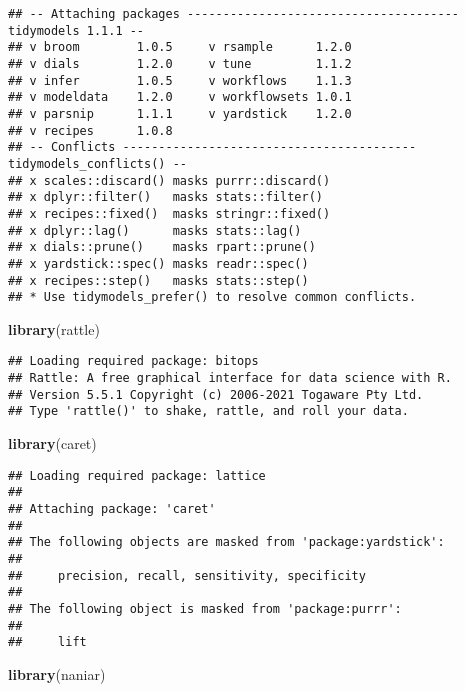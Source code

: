 \documentclass[
]{article}
\newenvironment{Shaded}{\begin{snugshade}}{\end{snugshade}}
\newcommand{\FunctionTok}[1]{\textcolor[rgb]{0.13,0.29,0.53}{\textbf{#1}}}
\newcommand{\NormalTok}[1]{#1}
\begin{document}
\begin{verbatim}
## -- Attaching packages -------------------------------------- tidymodels 1.1.1 --
## v broom        1.0.5     v rsample      1.2.0
## v dials        1.2.0     v tune         1.1.2
## v infer        1.0.5     v workflows    1.1.3
## v modeldata    1.2.0     v workflowsets 1.0.1
## v parsnip      1.1.1     v yardstick    1.2.0
## v recipes      1.0.8     
## -- Conflicts ----------------------------------------- tidymodels_conflicts() --
## x scales::discard() masks purrr::discard()
## x dplyr::filter()   masks stats::filter()
## x recipes::fixed()  masks stringr::fixed()
## x dplyr::lag()      masks stats::lag()
## x dials::prune()    masks rpart::prune()
## x yardstick::spec() masks readr::spec()
## x recipes::step()   masks stats::step()
## * Use tidymodels_prefer() to resolve common conflicts.
\end{verbatim}

\begin{Shaded}
\begin{Highlighting}[]
\FunctionTok{library}\NormalTok{(rattle)}
\end{Highlighting}
\end{Shaded}

\begin{verbatim}
## Loading required package: bitops
## Rattle: A free graphical interface for data science with R.
## Version 5.5.1 Copyright (c) 2006-2021 Togaware Pty Ltd.
## Type 'rattle()' to shake, rattle, and roll your data.
\end{verbatim}

\begin{Shaded}
\begin{Highlighting}[]
\FunctionTok{library}\NormalTok{(caret)}
\end{Highlighting}
\end{Shaded}

\begin{verbatim}
## Loading required package: lattice
## 
## Attaching package: 'caret'
## 
## The following objects are masked from 'package:yardstick':
## 
##     precision, recall, sensitivity, specificity
## 
## The following object is masked from 'package:purrr':
## 
##     lift
\end{verbatim}

\begin{Shaded}
\begin{Highlighting}[]
\FunctionTok{library}\NormalTok{(naniar)}
\end{Highlighting}
\end{Shaded}
\end{document}
